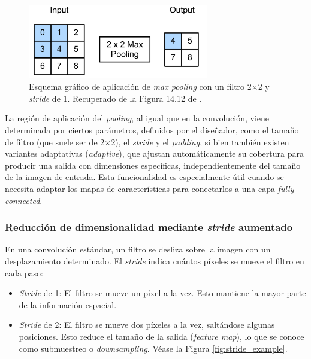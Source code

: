 \begin{figure}[h]
    \centering
    \includegraphics[width=0.7\textwidth]{capitulos/cap_02/imagenes/max_pooling.png}
    \caption[
        Esquema gráfico de aplicación de \textit{max pooling} con un filtro 2×2 y \textit{stride} de 1.
    ]{
        Esquema gráfico de aplicación de \textit{max pooling} con un filtro 2×2 y \textit{stride} de 1.
        Recuperado de la Figura 14.12 de \cite{murphy2022}.
    } 
    \label{fig:max_pooling}
\end{figure}

La región de aplicación del \textit{pooling}, al igual que en la convolución, viene determinada por ciertos 
parámetros, definidos por el diseñador, como el tamaño de filtro (que suele ser de 2×2), el \textit{stride} 
y el \textit{padding}, si bien también existen variantes  adaptativas (\textit{adaptive}), que ajustan
automáticamente su cobertura para producir una salida con dimensiones específicas, independientemente del 
tamaño de la imagen de entrada. Esta funcionalidad es especialmente útil cuando se necesita adaptar los mapas
de características para conectarlos a una capa \textit{fully-connected}. 





\subsubsection{Reducción de dimensionalidad mediante \textit{stride} aumentado}

En una convolución estándar, un filtro se desliza sobre la imagen con un desplazamiento determinado. El \textit{stride} indica cuántos píxeles se mueve el filtro en cada paso:

\begin{itemize}
    \item \textit{Stride} de 1: El filtro se mueve un píxel a la vez. Esto mantiene la mayor parte de la información espacial.
    \item \textit{Stride} de 2: El filtro se mueve dos píxeles a la vez, saltándose algunas posiciones. Esto reduce el tamaño de la salida (\textit{feature map}), lo que se conoce como submuestreo o \textit{downsampling}. Véase la Figura \ref{fig:stride_example}.
\end{itemize}

